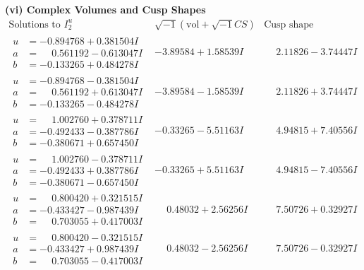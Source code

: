 \documentclass[1p]{elsarticle_modified}
\theoremstyle{definition}
\newcommand{\I}{\sqrt{-1}}
\begin{document}
\newpage\flushleft \textbf{(vi) Complex Volumes and Cusp Shapes}
$$\begin{array}{c|c|c}  
\text{Solutions to }I^u_{2}& \I (\text{vol} + \sqrt{-1}CS) & \text{Cusp shape}\\
 \hline 
\begin{aligned}
u &= -0.894768 + 0.381504 I \\
a &= \phantom{-}0.561192 - 0.613047 I \\
b &= -0.133265 + 0.484278 I\end{aligned}
 & -3.89584 + 1.58539 I & \phantom{-}2.11826 - 3.74447 I \\ \hline\begin{aligned}
u &= -0.894768 - 0.381504 I \\
a &= \phantom{-}0.561192 + 0.613047 I \\
b &= -0.133265 - 0.484278 I\end{aligned}
 & -3.89584 - 1.58539 I & \phantom{-}2.11826 + 3.74447 I \\ \hline\begin{aligned}
u &= \phantom{-}1.002760 + 0.378711 I \\
a &= -0.492433 - 0.387786 I \\
b &= -0.380671 + 0.657450 I\end{aligned}
 & -0.33265 - 5.51163 I & \phantom{-}4.94815 + 7.40556 I \\ \hline\begin{aligned}
u &= \phantom{-}1.002760 - 0.378711 I \\
a &= -0.492433 + 0.387786 I \\
b &= -0.380671 - 0.657450 I\end{aligned}
 & -0.33265 + 5.51163 I & \phantom{-}4.94815 - 7.40556 I \\ \hline\begin{aligned}
u &= \phantom{-}0.800420 + 0.321515 I \\
a &= -0.433427 - 0.987439 I \\
b &= \phantom{-}0.703055 + 0.417003 I\end{aligned}
 & \phantom{-}0.48032 + 2.56256 I & \phantom{-}7.50726 + 0.32927 I \\ \hline\begin{aligned}
u &= \phantom{-}0.800420 - 0.321515 I \\
a &= -0.433427 + 0.987439 I \\
b &= \phantom{-}0.703055 - 0.417003 I\end{aligned}
 & \phantom{-}0.48032 - 2.56256 I & \phantom{-}7.50726 - 0.32927 I \\ \hline\begin{aligned}

\end{aligned}
\end{array}$$
\end{document}

